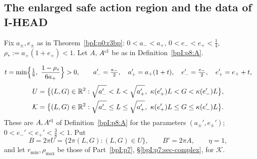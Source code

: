 \subsection{The enlarged safe action region and the data of I-HEAD}\label{bpI:p8:sec-safe}

Fix $a_\pm,e_\pm$ as in Theorem~\ref{bpI:p0:r3bp}: $0<a_-<a_+$, $0<e_-<e_+<\tfrac14$, $\rho_*:=a_+(1+e_+)<1$. Let $A$, $A^{\rm cl}$ be as in Definition~\ref{bpI:p8:A}.

\begin{definition}\label{bpI:p8:safe}
\[
t=\min\Bigl\{\tfrac18,\ \frac{1-\rho_*}{6a_+}\Bigr\}>0,\qquad a_-'=\tfrac{a_-}{2},\quad a_+'=a_+(1+t),\quad e_-'=\tfrac{e_-}2,\quad e_+'=e_++t,
\]
\begin{align*}
U&=\bigl\{(L,G)\in\R^2:\sqrt{a_-'}<L<\sqrt{a_+'},\ \kappa(e_+')L<G<\kappa(e_-')L\bigr\},\\
\mathcal K&=\bigl\{(L,G)\in\R^2:\sqrt{a_-'}\le L\le\sqrt{a_+'},\ \kappa(e_+')L\le G\le\kappa(e_-')L\bigr\}.
\end{align*}
These are $A,A^{\rm cl}$ of Definition~\ref{bpI:p8:A} for the parameters $(a_\pm',e_\pm')$; $0<e_-'<e_+'<\tfrac38<1$. Put
\[
B=2\pi U=\{2\pi(L,G):(L,G)\in U\},\qquad B'=2\pi A,\qquad\eta=1,
\]
and let $r_{\min},\rho_{\max}$ be those of Part~\ref{bpI:p7}, \S\ref{bpI:p7:sec-complex}, for $\mathcal K$.
\end{definition}

